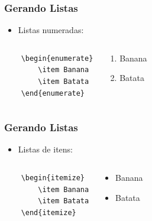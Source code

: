 \begin{frame}[fragile]
\frametitle{Gerando Listas}

\begin{itemize}
  \item Listas numeradas:
\end{itemize}
\begin{columns}
\begin{verbatim}
	\begin{enumerate}
		\item Banana
		\item Batata
	\end{enumerate}
\end{verbatim}
	\begin{framed}
	\begin{enumerate}
 		\item Banana
 		\item Batata
 	\end{enumerate}
	\end{framed}
\end{columns}
\end{frame}
	
	
\begin{frame}[fragile]
\frametitle{Gerando Listas}

\begin{itemize}
  \item Listas de itens:
\end{itemize}
\begin{columns}
\begin{verbatim}
	\begin{itemize}
		\item Banana
		\item Batata
	\end{itemize}
\end{verbatim}
	\begin{framed}
	\begin{itemize}
 		\item Banana
 		\item Batata
 	\end{itemize}
	\end{framed}
\end{columns}
\end{frame}


